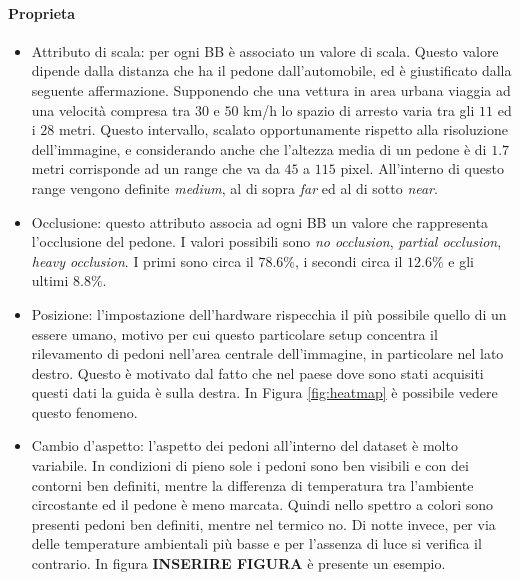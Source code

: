 \paragraph{Proprieta}
\begin{itemize}
    \item Attributo di scala: per ogni \ac{BB} è associato un valore di scala. Questo valore dipende dalla distanza che ha il pedone dall'automobile, ed è giustificato dalla seguente affermazione. Supponendo che una vettura in area urbana viaggia ad una velocità compresa tra $30$ e $50$ km/h lo spazio di arresto varia tra gli $11$ ed i $28$ metri. Questo intervallo, scalato opportunamente rispetto alla risoluzione dell'immagine, e considerando anche che l'altezza media di un pedone è di $1.7$ metri corrisponde ad un range che va da $45$ a $115$ pixel. All'interno di questo range vengono definite \textit{medium}, al di sopra \textit{far} ed al di sotto \textit{near}.
    \item Occlusione: questo attributo associa ad ogni \ac{BB} un valore che rappresenta l'occlusione del pedone. I valori possibili sono \textit{no occlusion}, \textit{partial occlusion}, \textit{heavy occlusion}. I primi sono circa il $78.6\%$, i secondi circa il $12.6\%$ e gli ultimi $8.8\%$.
    \item Posizione: l'impostazione dell'hardware rispecchia il più possibile quello di un essere umano, motivo per cui questo particolare setup concentra il rilevamento di pedoni nell'area centrale dell'immagine, in particolare nel lato destro. Questo è motivato dal fatto che nel paese dove sono stati acquisiti questi dati la guida è sulla destra. In Figura \ref{fig:heatmap} è possibile vedere questo fenomeno.
    \item Cambio d'aspetto: l'aspetto dei pedoni all'interno del dataset è molto variabile. In condizioni di pieno sole i pedoni sono ben visibili e con dei contorni ben definiti, mentre la differenza di temperatura tra l'ambiente circostante ed il pedone è meno marcata. Quindi nello spettro a colori sono presenti pedoni ben definiti, mentre nel termico no. Di notte invece, per via delle temperature ambientali più basse e per l'assenza di luce si verifica il contrario. In figura \textbf{INSERIRE FIGURA} è presente un esempio.
\end{itemize}
